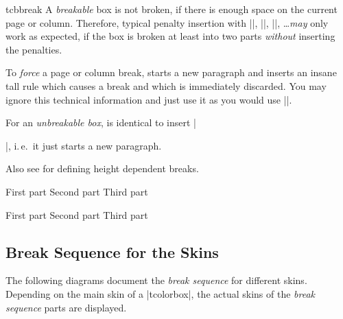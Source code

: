 \begin{docCommand}[doc new=2017-07-05]{tcbbreak}{}
  A \emph{breakable} box is not broken, if there is enough
  space on the current page or column.
  Therefore, typical penalty insertion with
  |\break|, |\pagebreak|, |\columnbreak|, \ldots \emph{may} only work as
  expected, if the box is broken at least into two parts
  \emph{without} inserting the penalties.\par\smallskip
  To \emph{force} a page or column break, 
  starts a new paragraph and inserts an insane tall rule which causes a
  break and which is immediately discarded. You may ignore this technical
  information and just use it as you would use |\pagebreak|.\par\smallskip
  For an \emph{unbreakable box},  is identical to insert |\par|,
  i.\,e.\ it just starts a new paragraph.\par\smallskip
  Also see  for defining height dependent breaks.

\begin{dispListing}
\begin{multicols}{3}
  \begin{tcolorbox}[breakable,enhanced jigsaw,size=small,
    colback=red!5!white,colframe=red!75!black,fonttitle=\bfseries,
    title=Break into parts
  ]
  First part\tcbbreak
  Second part\tcbbreak
  Third part
  \end{tcolorbox}
\end{multicols}

\begin{multicols}{3}
  \begin{tcolorbox}[enhanced jigsaw,size=small,
    colback=red!5!white,colframe=red!75!black,fonttitle=\bfseries,
    title=You shall not break
  ]
  First part\tcbbreak
  Second part\tcbbreak
  Third part
  \end{tcolorbox}
\end{multicols}

\end{dispListing}
{\tcbusetemp}

\end{docCommand}



\clearpage
\subsection{Break Sequence for the Skins}\label{subsec:breaksequence}
The following diagrams document the \emph{break sequence} for different
skins. Depending on the main skin of a |tcolorbox|, the actual skins of
the \emph{break sequence} parts are displayed.

